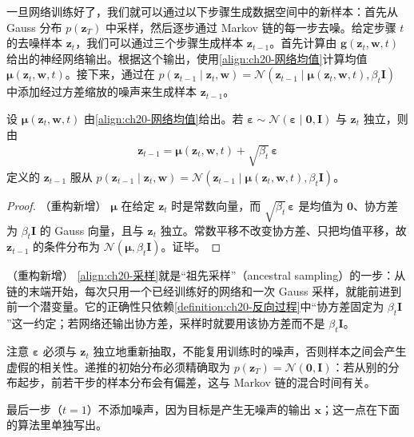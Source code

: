 \documentclass[../../main.tex]{subfiles}
\begin{document}
一旦网络训练好了，我们就可以通过以下步骤生成数据空间中的新样本：首先从 Gauss 分布 $p(\bm{z}_T)$ 中采样，然后逐步通过 Markov 链的每一步去噪。给定步骤 $t$ 的去噪样本 $\bm{z}_t$，我们可以通过三个步骤生成样本 $\bm{z}_{t-1}$。首先计算由 $\bm{g}(\bm{z}_t,\bm{w},t)$ 给出的神经网络输出。根据这个输出，使用\eqref{align:ch20-网络均值}计算均值 $\bm{\mu}(\bm{z}_t,\bm{w},t)$。接下来，通过在 $p(\bm{z}_{t-1}\mid\bm{z}_t,\bm{w})=\mathcal{N}(\bm{z}_{t-1}\mid\bm{\mu}(\bm{z}_t,\bm{w},t),\beta_t\bm{I})$ 中添加经过方差缩放的噪声来生成样本 $\bm{z}_{t-1}$。

\begin{proposition}[采样递推]\label{proposition:ch20-采样递推}
设 $\bm{\mu}(\bm{z}_t,\bm{w},t)$ 由\eqref{align:ch20-网络均值}给出。若 $\bm{\varepsilon}\sim\mathcal{N}(\bm{\varepsilon}\mid\bm{0},\bm{I})$ 与 $\bm{z}_t$ 独立，则由
\begin{align}
\bm{z}_{t-1}=\bm{\mu}(\bm{z}_t,\bm{w},t)+\sqrt{\beta_t}\,\bm{\varepsilon}
\label{align:ch20-采样}
\end{align}
定义的 $\bm{z}_{t-1}$ 服从 $p(\bm{z}_{t-1}\mid\bm{z}_t,\bm{w})=\mathcal{N}(\bm{z}_{t-1}\mid\bm{\mu}(\bm{z}_t,\bm{w},t),\beta_t\bm{I})$。
\end{proposition}

\begin{proof}（重构新增）
$\bm{\mu}$ 在给定 $\bm{z}_t$ 时是常数向量，而 $\sqrt{\beta_t}\,\bm{\varepsilon}$ 是均值为 $\bm{0}$、协方差为 $\beta_t\bm{I}$ 的 Gauss 向量，且与 $\bm{z}_t$ 独立。常数平移不改变协方差、只把均值平移，故 $\bm{z}_{t-1}$ 的条件分布为 $\mathcal{N}(\bm{\mu},\beta_t\bm{I})$。证毕。
\end{proof}

\begin{remark}（重构新增）
\eqref{align:ch20-采样}就是“祖先采样”（ancestral sampling）的一步：从链的末端开始，每次只用一个已经训练好的网络和一次 Gauss 采样，就能前进到前一个潜变量。它的正确性只依赖\cref{definition:ch20-反向过程}中“协方差固定为 $\beta_t\bm{I}$”这一约定；若网络还输出协方差，采样时就要用该协方差而不是 $\beta_t\bm{I}$。\par
注意 $\bm{\varepsilon}$ 必须与 $\bm{z}_t$ 独立地重新抽取，不能复用训练时的噪声，否则样本之间会产生虚假的相关性。递推的初始分布必须精确取为 $p(\bm{z}_T)=\mathcal{N}(\bm{0},\bm{I})$：若从别的分布起步，前若干步的样本分布会有偏差，这与 Markov 链的混合时间有关。\par
最后一步（$t=1$）不添加噪声，因为目标是产生无噪声的输出 $\bm{x}$；这一点在下面的算法里单独写出。
\end{remark}
\end{document}
